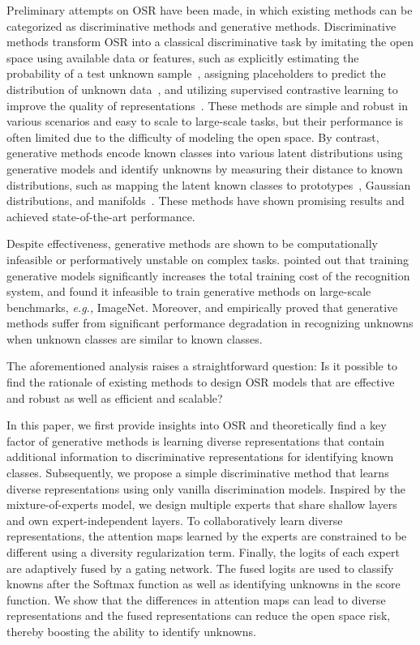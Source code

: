 \documentclass[letterpaper]{article} %
\begin{document}
Preliminary attempts on OSR have been made, in which existing methods can be categorized as discriminative methods and generative methods. Discriminative methods transform OSR into a classical discriminative task by imitating the open space using available data or features, such as explicitly estimating the probability of a test unknown sample~\cite{bendale2016towards}, assigning placeholders to predict the distribution of unknown data~\cite{zhou2021learning}, and utilizing supervised contrastive learning to improve the quality of representations~\cite{xu2023contrastive}. These methods are simple and robust in various scenarios and easy to scale to large-scale tasks, but their performance is often limited due to the difficulty of modeling the open space. By contrast, generative methods encode known classes into various latent distributions using generative models and identify unknowns by measuring their distance to known distributions, such as mapping the latent known classes to prototypes~\cite{yang2022convolutional}, Gaussian distributions, and manifolds~\cite{oza2019c2ae}. These methods have shown promising results and achieved state-of-the-art performance.

Despite effectiveness, generative methods are shown to be computationally infeasible or performatively unstable on complex tasks. \cite{xu2023contrastive} pointed out that training generative models significantly increases the total training cost of the recognition system, and \cite{vaze2022openset} found it infeasible to train generative methods on large-scale benchmarks, \emph{e.g.,} ImageNet. Moreover, \cite{guo2021conditional} and \cite{huang2023class} empirically proved that generative methods suffer from significant performance degradation in recognizing unknowns when unknown classes are similar to known classes.

The aforementioned analysis raises a straightforward question: Is it possible to find the rationale of existing methods to design OSR models that are effective and robust as well as efficient and scalable?

In this paper, we first provide insights into OSR and theoretically find a key factor of generative methods is learning diverse representations that contain additional information to discriminative representations for identifying known classes. Subsequently, we propose a simple discriminative method that learns diverse representations using only vanilla discrimination models. Inspired by the mixture-of-experts model, we design multiple experts that share shallow layers and own expert-independent layers. To collaboratively learn diverse representations, the attention maps learned by the experts are constrained to be different using a diversity regularization term. Finally, the logits of each expert are adaptively fused by a gating network. The fused logits are used to classify knowns after the Softmax function as well as identifying unknowns in the score function. We show that the differences in attention maps can lead to diverse representations and the fused representations can reduce the open space risk, thereby boosting the ability to identify unknowns.
\end{document}

